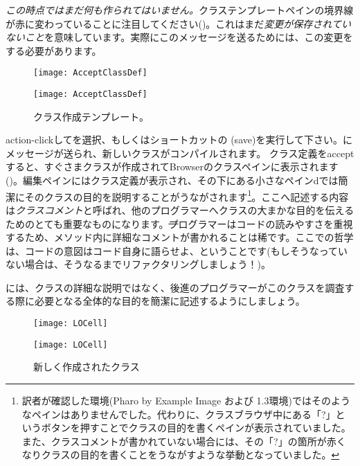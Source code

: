 \documentclass[a4paper,10pt,twoside]{book}
\begin{document}
\emph{この時点ではまだ何も作られてはいません。}クラステンプレートペインの境界線が赤に変わっていることに注目してください()。これはまだ\emph{変更が保存されていないこと}を意味しています。実際にこのメッセージを送るためには、この変更をする必要があります。

\begin{figure}[h!t]
\ifluluelse
	{\centerline {\texttt{[image: AcceptClassDef]}}}
	{\centerline {\texttt{[image: AcceptClassDef]}}}
\caption{クラス作成テンプレート。
}
\end{figure}

action-clickしてを選択、もしくはショートカットの (save)を実行して下さい。にメッセージが送られ、新しいクラスがコンパイルされます。
クラス定義をacceptすると、すぐさまクラスが作成されてBrowserのクラスペインに表示されます()。編集ペインにはクラス定義が表示され、その下にある小さなペインdでは簡潔にそのクラスの目的を説明することがうながされます\footnote{訳者が確認した環境(Pharo by Example Image および 1.3環境)ではそのようなペインはありませんでした。代わりに、クラスブラウザ中にある「?」というボタンを押すことでクラスの目的を書くペインが表示されていました。また、クラスコメントが書かれていない場合には、その「?」の箇所が赤くなりクラスの目的を書くことをうながすような挙動となっていました。}。ここへ記述する内容は\emph{クラスコメント}と呼ばれ、他のプログラマーへクラスの大まかな目的を伝えるためのとても重要なものになります。\st プログラマーはコードの読みやすさを重視するため、メソッド内に詳細なコメントが書かれることは稀です。ここでの哲学は、コードの意図はコード自身に語らせよ、ということです(もしそうなっていない場合は、そうなるまでリファクタリングしましょう！)。


には、クラスの詳細な説明ではなく、後進のプログラマーがこのクラスを調査する際に必要となる全体的な目的を簡潔に記述するようにしましょう。


\begin{figure}[h!t]
\ifluluelse
	{\centerline {\texttt{[image: LOCell]}}}
	{\centerline {\texttt{[image: LOCell]}}}
\caption{新しく作成されたクラス }
\end{figure}
\end{document}
